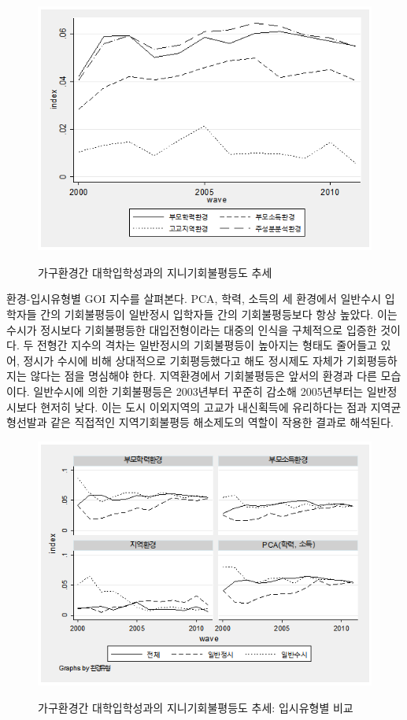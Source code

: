 \begin{figure}
    \centering
    \caption{가구환경간 대학입학성과의 지니기회불평등도 추세}
    \includegraphics[width=\textwidth]{figure/goms_goi_byenv.png}
    \label{fig:goms_goi_byenv}
\end{figure}

환경-입시유형별 GOI 지수를 살펴본다.
PCA, 학력, 소득의 세 환경에서 일반수시 입학자들 간의 기회불평등이 일반정시 입학자들 간의 기회불평등보다 항상 높았다.
 이는 수시가 정시보다 기회불평등한 대입전형이라는 대중의 인식을 구체적으로 입증한 것이다.
 두 전형간 지수의 격차는 일반정시의 기회불평등이 높아지는 형태도 줄어들고 있어, 정시가 수시에 비해 상대적으로 기회평등했다고 해도 정시제도 자체가 기회평등하지는 않다는 점을 명심해야 한다.
 지역환경에서 기회불평등은 앞서의 환경과 다른 모습이다.
 일반수시에 의한 기회불평등은 2003년부터 꾸준히 감소해 2005년부터는 일반정시보다 현저히 낮다.
 이는 도시 이외지역의 고교가 내신획득에 유리하다는 점과 지역균형선발과 같은 직접적인 지역기회불평등 해소제도의 역할이 작용한 결과로 해석된다.

\begin{figure}
    \centering
    \caption{가구환경간 대학입학성과의 지니기회불평등도 추세: 입시유형별 비교}
    \includegraphics[width=\textwidth]{figure/goms_goi_byent.png}
    \label{fig:goms_goi_byent}
\end{figure}

